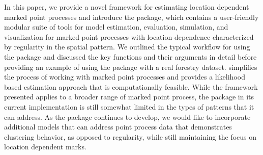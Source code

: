 In this paper, we provide a novel framework for estimating location
dependent marked point processes and introduce the  package,
which contains a user-friendly modular suite of tools for model
estimation, evaluation, simulation, and visualization for marked point
processes with location dependence characterized by regularity in the
spatial pattern. We outlined the typical workflow for using the package
and discussed the key functions and their arguments in detail before
providing an example of using the package with a real forestry dataset.
 simplifies the process of working with marked point
processes and provides a likelihood based estimation approach that is
computationally feasible. While the framework presented applies to a
broader range of marked point process, the package in its current
implementation is still somewhat limited in the types of patterns that
it can address. As the package continues to develop, we would like to incorporate additional models that can
address point process data that demonstrates clustering behavior, as
opposed to regularity, while still maintaining the focus on location
dependent marks.



\address{%
Lane Drew\\
Colorado State University\\%
Department of Statistics, Colorado State University\\ 851 Oval Dr, Fort Collins, CO 80524\\
%
\url{https://lanedrew.com/}\\%
\textit{ORCiD: \href{https://orcid.org/0009-0006-5427-4092}{0009-0006-5427-4092}}\\%
\href{mailto:lane.drew@colostate.edu}{\nolinkurl{lane.drew@colostate.edu}}%
}

\address{%
Andee Kaplan\\
Colorado State University\\%
Department of Statistics, Colorado State University\\ 851 Oval Dr, Fort Collins, CO 80524\\
%
\url{https://andeekaplan.com/}\\%
\textit{ORCiD: \href{https://orcid.org/0000-0002-0912-0225}{0000-0002-0912-0225}}\\%
\href{mailto:andee.kaplan@colostate.edu}{\nolinkurl{andee.kaplan@colostate.edu}}%
}
